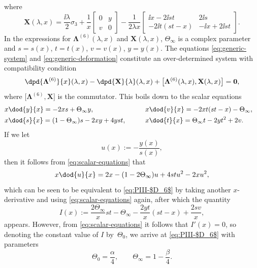 where
\begin{equation*}
\mathbf{X}(\lambda, x) = \dfrac{\ii \lambda}{2} \sigma_3 + \dfrac{1}{x} \begin{bmatrix} 0 & y \\ v & 0 \end{bmatrix} - \dfrac{1}{2\lambda x} \begin{bmatrix} \ii x - 2\ii st & 2\ii s \\ -2\ii t(st - x) & -\ii x + 2\ii st\end{bmatrix}.
\end{equation*}
In the expressions for $\mathbf{\Lambda}^{(6)}(\lambda, x)$ and $\mathbf{X}(\lambda, x)$, $\Theta_\infty$ is a complex parameter and $s = s(x)$, $t = t(x)$, $ v = v(x)$, $y = y(x)$. The equations \eqref{eq:generic-system} and \eqref{eq:generic-deformation} constitute an over-determined system with compatibility condition
\[
\dpd{\mathbf{\Lambda}^{(6)}}{x}(\lambda, x) - \dpd{\mathbf X}{\lambda}(\lambda, x) + \big[\mathbf{\Lambda}^{(6)}(\lambda, x), \mathbf X(\lambda, x)\big] = \mathbf{0},
\]
where $\big[\mathbf{\Lambda}^{(6)}, \mathbf{X}\big]$ is the commutator. This boils down to the scalar equations
\begin{alignat}{3}
& x \dod{y}{x} = -2xs + \Theta_\infty y, \qquad&&
x \dod{v}{x} = -2xt(st - x) - \Theta_\infty,&\nonumber \\
&x \dod{s}{x} = (1 - \Theta_\infty)s - 2xy + 4yst, \qquad&&
x \dod{t}{x} = \Theta_\infty t - 2yt^2 + 2v.&
\label{eq:scalar-equations}
\end{alignat}
If we let
\begin{equation}
u(x) := - \dfrac{y(x)}{s(x)},
\label{eq:u-from-y-s}
\end{equation}
then it follows from \eqref{eq:scalar-equations} that
\[
x \dod{u}{x} = 2x - (1 - 2\Theta_\infty) u + 4stu^2 - 2xu^2,
\]
which can be seen to be equivalent to \eqref{eq:PIII-$D_6$} by taking another $x$-derivative and using \eqref{eq:scalar-equations} again, after which the quantity
\[
I(x) := \dfrac{2\Theta_\infty }{x} st - \Theta_\infty - \dfrac{2yt}{x}(st - x) + \dfrac{2sv}{x},
\]
appears. However, from \eqref{eq:scalar-equations} it follows that $I'(x) = 0$, so denoting the constant value of $I$ by~$\Theta_0$, we arrive at \eqref{eq:PIII-$D_6$} with parameters
\begin{equation}
 \Theta_0=\frac{\alpha}{4}, \qquad \Theta_\infty=1-\frac{\beta}{4}.
 \label{eq:thetas-alpha-beta}
\end{equation}

